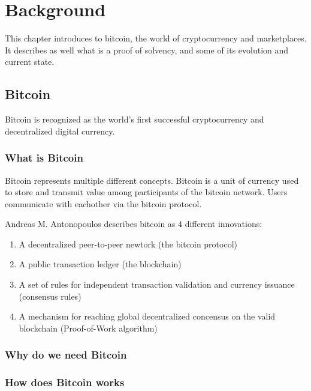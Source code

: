 
\chapter{Background}
This chapter introduces to bitcoin, the world of cryptocurrency and marketplaces. It describes as well 
what is a proof of solvency, and some of its evolution and current state.

\section{Bitcoin}

Bitcoin is recognized as the world's first successful cryptocurrency and decentralized digital currency. 


\subsection{What is Bitcoin}
Bitcoin represents multiple different concepts. Bitcoin is a unit of currency used to store and transmit value among participants of the bitcoin network.
Users communicate with eachother via the bitcoin protocol. 

Andreas M. Antonopoulos describes bitcoin as 4 different innovations:
\begin{enumerate}

    \item A decentralized peer-to-peer newtork (the bitcoin protocol)
    
    \item A public transaction ledger (the blockchain)
    
    \item A set of rules for independent transaction validation and currency issuance (consensus rules) 

    \item A mechanism for reaching global decentralized concensus on the valid blockchain (Proof-of-Work algorithm)
    
    \end{enumerate}



\subsection{Why do we need Bitcoin}

\subsection{How does Bitcoin works}

